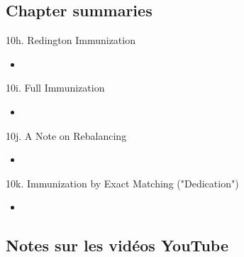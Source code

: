 \subsection{Chapter summaries}

\begin{CHPT_SUMM_AUTO}[label = {L.-10h}]{10h. Redington Immunization}
	\begin{itemize}
		\item	
	\end{itemize}
\end{CHPT_SUMM_AUTO}

\begin{CHPT_SUMM_AUTO}[label = {L.-10i}]{10i. Full Immunization}
	\begin{itemize}
		\item	
	\end{itemize}
\end{CHPT_SUMM_AUTO}

\begin{CHPT_SUMM_AUTO}[label = {L.-10j}]{10j. A Note on Rebalancing}
	\begin{itemize}
		\item	
	\end{itemize}
\end{CHPT_SUMM_AUTO}

\begin{CHPT_SUMM_AUTO}[label = {L.-10k}]{10k. Immunization by Exact Matching ("Dedication")}
	\begin{itemize}
		\item	
	\end{itemize}
\end{CHPT_SUMM_AUTO}

\subsection{Notes sur les vidéos YouTube}

